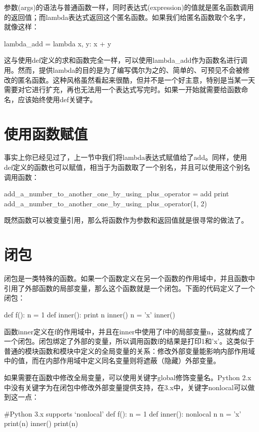 \documentclass[12pt,a4paper]{report}
\begin{document}
参数(args)的语法与普通函数一样，同时表达式(expression)的值就是匿名函数调用的返回值；而lambda表达式返回这个匿名函数。如果我们给匿名函数取个名字，就像这样： 
\begin{python}[moreemph={[4]42},caption={},label=ex1]
lambda_add = lambda x, y: x + y
\end{python}

这与使用def定义的求和函数完全一样，可以使用lambda\_add作为函数名进行调用。然而，提供lambda的目的是为了编写偶尔为之的、简单的、可预见不会被修改的匿名函数。这种风格虽然看起来很酷，但并不是一个好主意，特别是当某一天需要对它进行扩充，再也无法用一个表达式写完时。如果一开始就需要给函数命名，应该始终使用def关键字。 
\section{使用函数赋值} 

事实上你已经见过了，上一节中我们将lambda表达式赋值给了add。同样，使用def定义的函数也可以赋值，相当于为函数取了一个别名，并且可以使用这个别名调用函数：
\begin{python}[moreemph={[4]42},caption={},label=ex1]
add_a_number_to_another_one_by_using_plus_operator = add
print add_a_number_to_another_one_by_using_plus_operator(1, 2)
\end{python}

既然函数可以被变量引用，那么将函数作为参数和返回值就是很寻常的做法了。

\section{闭包}
闭包是一类特殊的函数。如果一个函数定义在另一个函数的作用域中，并且函数中引用了外部函数的局部变量，那么这个函数就是一个闭包。下面的代码定义了一个闭包： 
\begin{python}[moreemph={[4]42},caption={},label=ex1]
def f():
    n = 1
    def inner():
        print n
    inner()
    n = 'x'
    inner()
\end{python}

函数inner定义在f的作用域中，并且在inner中使用了f中的局部变量n，这就构成了一个闭包。闭包绑定了外部的变量，所以调用函数f的结果是打印1和'x'。这类似于普通的模块函数和模块中定义的全局变量的关系：修改外部变量能影响内部作用域中的值，而在内部作用域中定义同名变量则将遮蔽（隐藏）外部变量。

如果需要在函数中修改全局变量，可以使用关键字global修饰变量名。Python 2.x中没有关键字为在闭包中修改外部变量提供支持，在3.x中，关键字nonlocal可以做到这一点： 
\begin{python}[moreemph={[4]42},caption={},label=ex1]
#Python 3.x supports `nonlocal'
def f():
    n = 1
    def inner():
    nonlocal n
    n = 'x'
print(n)
inner()
print(n)
\end{python}
\end{document}
